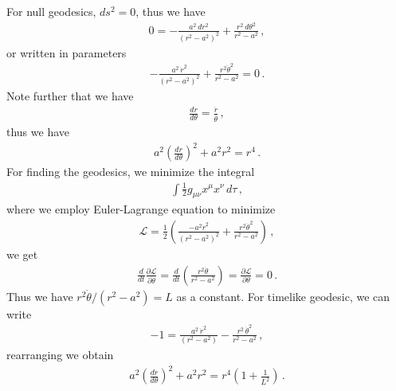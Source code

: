 \documentclass[11pt, onesided]{book}
\theoremstyle{break}
\theoremstyle{break}
\newcommand{\pd}{\partial}
\begin{document}
For null geodesics, $ds^2 =0$, thus we have
\begin{align*}
0 = -\frac{a^2\, dr^2}{(r^2 - a^2)^2} + \frac{r^2\, d\theta^2}{r^2 - a^2}\,,
\end{align*}
or written in parameters
\begin{align*}
-\frac{a^2 \, \dot{r}^2}{(r^2 - a^2)^2} + \frac{r^2 \dot{\theta}^2}{r^2 - a^2} = 0\,.
\end{align*}
Note further that we have
\begin{align*}
\frac{dr}{d\theta} = \frac{\dot{r}}{\dot{\theta}}\,,
\end{align*}
thus we have
\begin{align*}
a^2\left( \frac{dr}{d\theta}\right)^2 + a^2 r^2 = r^4\,.
\end{align*}
For finding the geodesics, we minimize the integral
\begin{align*}
\int \frac{1}{2}g_{\mu\nu}x^\mu x^\nu \, d\tau\,,
\end{align*}
where we employ Euler-Lagrange equation to minimize
\begin{align*}
\mathcal{L} = \frac{1}{2}\left( \frac{-a^2\dot{r}^2}{(r^2 -a^2)^2} + \frac{r^2 \dot{\theta}^2}{r^2 - a^2}\right)\,,
\end{align*}
we get
\begin{align*}
\frac{d}{dt}\frac{\pd \mathcal{L}}{\pd \dot{\theta}} = \frac{d}{dt}\left(\frac{r^2 \dot{\theta}}{r^2 - a^2}  \right)=\frac{\pd \mathcal{L}}{\pd \theta} = 0 \,.
\end{align*}
Thus we have $r^2\dot{\theta}/(r^2 - a^2) = L$ as a constant. For timelike geodesic, we can write
\begin{align*}
-1 = \frac{a^2\, \dot{r}^2}{(r^2 - a^2)} - \frac{r^2\, \dot{\theta}^2}{r^2 - a^2}\,,
\end{align*}
rearranging we obtain
\begin{align*}
a^2\left( \frac{dr}{d\theta}\right)^2 + a^2 r^2 = r^4\left( 1+ \frac{1}{L^2}\right)\,.
\end{align*}
\end{document}
